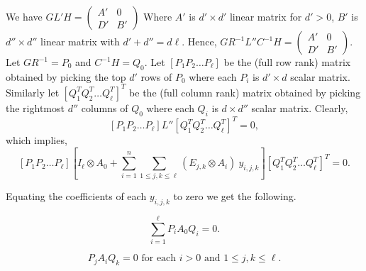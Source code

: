 \documentclass[10pt,a4paper]{article}
\begin{document}
 We have $G L' H = \left(
\begin{array}{c|c}
A' & 0 \\
\hline
D' & B'
\end{array}
\right)$
Where $A'$ is $d' \times d'$ linear matrix for $d'>0$, $B'$ is $d''
\times d''$ linear matrix with $d' + d'' = d \ell$. Hence, $GR^{-1}
L''C^{-1} H = \left(
\begin{array}{c|c}
A' & 0 \\
\hline
D' & B'
\end{array}
\right)$.  Let $GR^{-1}=P_0$ and $C^{-1}H=Q_0$. Let $[ P_1 P_2 \ldots
  P_\ell]$ be the (full row rank) matrix obtained by picking the top
$d'$ rows of $P_0$ where each $P_i$ is $d' \times d$ scalar
matrix. Similarly let $[ Q_1^T Q_2^T \ldots Q_\ell^T]^T$ be the (full column
rank) matrix obtained by picking the rightmost $d''$ columns of $Q_0$
where each $Q_i$ is $d \times d''$ scalar matrix. Clearly,
\[   [ P_1 P_2 \ldots P_\ell] L'' [ Q_1^T Q_2^T \ldots Q_\ell^T]^T = 0, \]
which implies,
\[   [ P_1 P_2 \ldots P_\ell]\left[ I_\ell \otimes A_0 + \sum_{i=1}^n \sum_{1 \leq j, k \leq \ell} (E_{j,k} \otimes A_i)~ y_{i,j,k} \right] [ Q_1^T Q_2^T \ldots Q_\ell^T]^T = 0. \]

Equating the coefficients of each $y_{i,j,k}$ to zero we get the following.

\begin{equation} \label{eqn-A0}
\sum _{i=1}^\ell P_i A_0 Q_i = 0.
\end{equation} 

\begin{equation} \label{eqn-An0}
P_j A_i Q_k =0 \textrm{ for each } i>0 \textrm { and } 1\leq j,k \leq
\ell.
\end{equation} 
\end{document}
